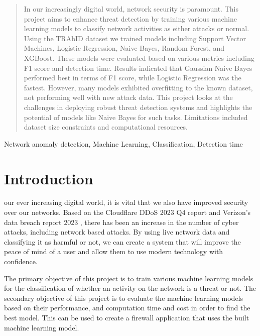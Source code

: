 \begin{abstract}
In our increasingly digital world, network security is paramount. This project aims to enhance threat detection by training various machine learning models to classify network activities as either attacks or normal. Using the TRAbID dataset we trained models including Support Vector Machines, Logistic Regression, Naive Bayes, Random Forest, and XGBoost. These models were evaluated based on various metrics including F1 score and detection time. Results indicated that Gaussian Naive Bayes performed best in terms of F1 score, while Logistic Regression was the fastest. However, many models exhibited overfitting to the known dataset, not performing well with new attack data. This project looks at the challenges in deploying robust threat detection systems and highlights the potential of models like Naive Bayes for such tasks. Limitations included dataset size constraints and computational resources.%
\end{abstract}

\begin{IEEEkeywords}
Network anomaly detection, Machine Learning, Classification, Detection time
\end{IEEEkeywords}

\IEEEpeerreviewmaketitle



\section{Introduction}

 our ever increasing digital world, it is vital that we also have improved security over our networks. Based on the Cloudflare DDoS 2023 Q4 report \cite{cloudflare} and Verizon’s data breach report 2023 \cite{verizion}, there has been an increase in the number of cyber attacks, including network based attacks. By using live network data and classifying it as harmful or not, we can create a system that will improve the peace of mind of a user and allow them to use modern technology with confidence.

The primary objective of this project is to train various machine learning models for the classification of whether an activity on the network is a threat or not. The secondary objective of this project is to evaluate the machine learning models based on their performance, and computation time and cost in order to find the best model. This can be used to create a firewall application that uses the built machine learning model.

